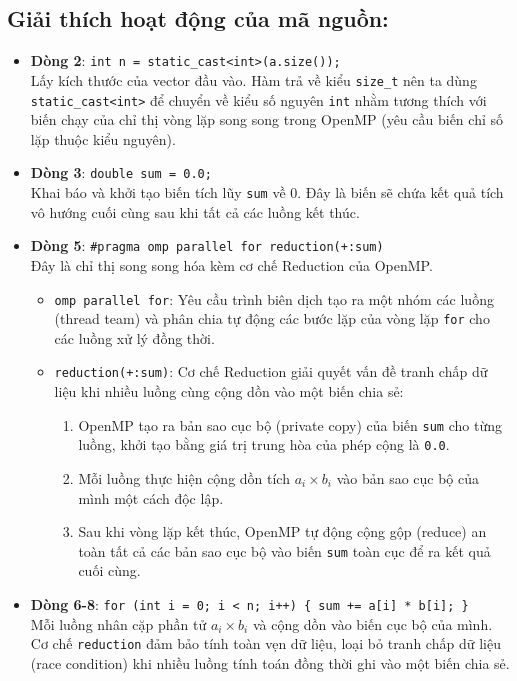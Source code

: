 \subsection*{Giải thích hoạt động của mã nguồn:}
\begin{itemize}
  \item \textbf{Dòng 2}: \texttt{int n = static\_cast<int>(a.size());} \\
        Lấy kích thước của vector đầu vào. Hàm trả về kiểu \texttt{size\_t} nên ta dùng \texttt{static\_cast<int>} để chuyển về kiểu số nguyên \texttt{int} nhằm tương thích với biến chạy của chỉ thị vòng lặp song song trong OpenMP (yêu cầu biến chỉ số lặp thuộc kiểu nguyên).
  \item \textbf{Dòng 3}: \texttt{double sum = 0.0;} \\
        Khai báo và khởi tạo biến tích lũy \texttt{sum} về $0$. Đây là biến sẽ chứa kết quả tích vô hướng cuối cùng sau khi tất cả các luồng kết thúc.
  \item \textbf{Dòng 5}: \texttt{\#pragma omp parallel for reduction(+:sum)} \\
        Đây là chỉ thị song song hóa kèm cơ chế Reduction của OpenMP.
        \begin{itemize}
          \item \texttt{omp parallel for}: Yêu cầu trình biên dịch tạo ra một nhóm các luồng (thread team) và phân chia tự động các bước lặp của vòng lặp \texttt{for} cho các luồng xử lý đồng thời.
          \item \texttt{reduction(+:sum)}: Cơ chế Reduction giải quyết vấn đề tranh chấp dữ liệu khi nhiều luồng cùng cộng dồn vào một biến chia sẻ:
                \begin{enumerate}
                  \item OpenMP tạo ra bản sao cục bộ (private copy) của biến \texttt{sum} cho từng luồng, khởi tạo bằng giá trị trung hòa của phép cộng là \texttt{0.0}.
                  \item Mỗi luồng thực hiện cộng dồn tích $a_i \times b_i$ vào bản sao cục bộ của mình một cách độc lập.
                  \item Sau khi vòng lặp kết thúc, OpenMP tự động cộng gộp (reduce) an toàn tất cả các bản sao cục bộ vào biến \texttt{sum} toàn cục để ra kết quả cuối cùng.
                \end{enumerate}
        \end{itemize}
  \item \textbf{Dòng 6-8}: \texttt{for (int i = 0; i < n; i++) \{ sum += a[i] * b[i]; \}} \\
        Mỗi luồng nhân cặp phần tử $a_i \times b_i$ và cộng dồn vào biến cục bộ của mình. Cơ chế \texttt{reduction} đảm bảo tính toàn vẹn dữ liệu, loại bỏ tranh chấp dữ liệu (race condition) khi nhiều luồng tính toán đồng thời ghi vào một biến chia sẻ.
\end{itemize}

